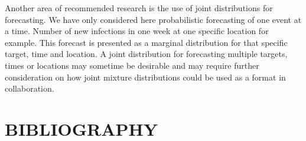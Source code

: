 \documentclass[11pt,notitlepage]{isuthesis}
\begin{document}
Another area of recommended research is the use of joint distributions for 
forecasting. We have only considered here probabilistic forecasting of one 
event at a time. Number of new infections in one week at one specific location
for example. This forecast is presented as a marginal distribution for that 
specific target, time and location. A joint distribution for forecasting 
multiple targets, times or locations may sometime be desirable and may require
further consideration on how joint mixture distributions could be used as a 
format in collaboration.






















% 
% 
% 
% 
% 
%




% 
% 

% 
%     


\clearpage
\nocite{*}
\unappendixtitle
\newpage
{}
{}
\section*{BIBLIOGRAPHY}

\vspace{-20pt}
\begingroup
   \setlength{\bibsep}{14.5pt}
   \linespread{1}\selectfont

\endgroup

\appendix
\end{document}
